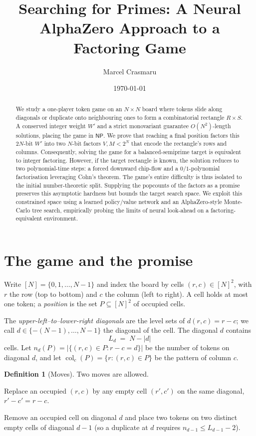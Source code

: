 \documentclass[11pt]{article}
\title{Searching for Primes: A Neural AlphaZero Approach to a Factoring Game}
\author{Marcel Crasmaru}
\date{\today}
\theoremstyle{definition}
\newtheorem{definition}{Definition}
\theoremstyle{plain}
\theoremstyle{remark}
\newcommand{\col}{\operatorname{col}}
\begin{document}
\maketitle

\begin{abstract}
We study a one-player token game on an $N\times N$ board where tokens slide along diagonals
or duplicate onto neighbouring ones to form a combinatorial rectangle $R\times S$. A conserved
integer weight $W'$ and a strict monovariant guarantee $O(N^2)$-length solutions, placing
the game in $\mathsf{NP}$. We prove that reaching a final position factors this $2N$-bit $W'$
into two $N$-bit factors $V,M < 2^{N}$ that encode the rectangle's rows and columns. Consequently, solving the game for a balanced-semiprime target is equivalent to
integer factoring. However, if the target rectangle is known, the solution reduces to two
polynomial-time steps: a forced downward chip-flow and a $0/1$-polynomial factorisation
leveraging Cohn's theorem. The game's entire difficulty is thus isolated to the initial
number-theoretic split. Supplying the popcounts of the factors as a promise preserves this
asymptotic hardness but bounds the target search space. We exploit this constrained space
using a learned policy/value network and an AlphaZero-style Monte-Carlo tree search,
empirically probing the limits of neural look-ahead on a factoring-equivalent environment.
\end{abstract}

\section{The game and the promise}

Write $[N]=\{0,1,\dots,N-1\}$ and index the board by cells $(r,c)\in[N]^2$, with
$r$ the row (top to bottom) and $c$ the column (left to right).  A cell holds at
most one token; a \emph{position} is the set $P\subseteq[N]^2$ of occupied cells.

The \emph{upper-left--to--lower-right diagonals} are the level sets of
$d(r,c)=r-c$; we call $d\in\{-(N-1),\dots,N-1\}$ the diagonal of the cell.  The
diagonal $d$ contains
\[
L_d \;=\; N-|d|
\]
cells.  Let $n_d(P)=|\{(r,c)\in P: r-c=d\}|$ be the number of tokens on diagonal
$d$, and let $\col_c(P)=\{r:(r,c)\in P\}$ be the pattern of column $c$.

\begin{definition}[Moves]\label{def:moves}
Two moves are allowed.
\begin{description}[leftmargin=2em]
\item[Slide.] Replace an occupied $(r,c)$ by any empty cell $(r',c')$ on the same
diagonal, $r'-c'=r-c$.
\item[Duplicate.] Remove an occupied cell on diagonal $d$ and place two tokens on
two distinct empty cells of diagonal $d-1$ (so a duplicate at $d$ requires
$n_{d-1}\le L_{d-1}-2$).
\end{description}
\end{definition}
\end{document}
